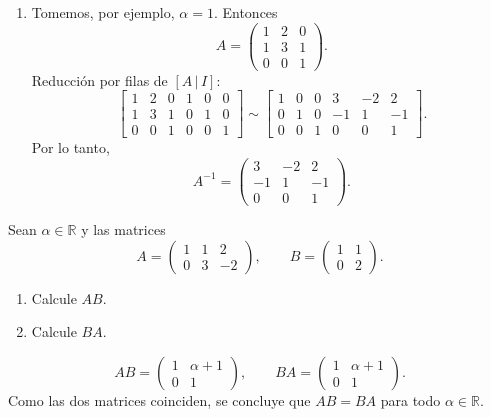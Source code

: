 \documentclass[11pt,a5]{aleph-examen}
\begin{document}
\begin{preguntas}
\begin{respuesta}
\begin{enumerate}
    \item Tomemos, por ejemplo, \(\alpha=1\). Entonces
    \[
        A=\begin{pmatrix}
            1 & 2 & 0 \\
            1 & 3 & 1 \\
            0 & 0 & 1
        \end{pmatrix}.
    \]
    Reducción por filas de \([A\,|\,I]\):
    \[
        \left[\begin{array}{ccc|ccc}
            1 & 2 & 0 & 1 & 0 & 0 \\
            1 & 3 & 1 & 0 & 1 & 0 \\
            0 & 0 & 1 & 0 & 0 & 1
        \end{array}\right]
        \sim
        \left[\begin{array}{ccc|ccc}
            1 & 0 & 0 & 3 & -2 & 2 \\
            0 & 1 & 0 & -1 & 1 & -1 \\
            0 & 0 & 1 & 0 & 0 & 1
        \end{array}\right].
    \]
    Por lo tanto,
    \[
        A^{-1}=\begin{pmatrix}
            3 & -2 & 2 \\
            -1 & 1 & -1 \\
            0 & 0 & 1
        \end{pmatrix}.
    \]
\end{enumerate}
\end{respuesta}

\item
Sean \( \alpha \in \mathbb{R} \) y las matrices
\[
    A=\begin{pmatrix}
        1 & 1 & 2 \\
        0 & 3 & -2
    \end{pmatrix},
    \qquad
    B=\begin{pmatrix}
        1 & 1 \\
        0 & 2
    \end{pmatrix}.
\]

\begin{enumerate}
    \item Calcule \( AB \).
    \item Calcule \( BA \).
\end{enumerate}

\begin{respuesta}
\[
    AB=\begin{pmatrix}
        1 & \alpha+1 \\
        0 & 1
    \end{pmatrix},
    \qquad
    BA=\begin{pmatrix}
        1 & \alpha+1 \\
        0 & 1
    \end{pmatrix}.
\]
Como las dos matrices coinciden, se concluye que \(AB=BA\) para todo \(\alpha\in\mathbb{R}\).
\end{respuesta}

\end{preguntas}
\end{document}
